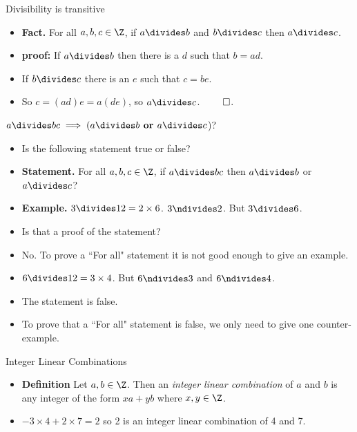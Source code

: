 \documentclass[handout]{beamer}
\begin{document}

\begin{frame}{Divisibility is transitive}

\begin{itemize}
  \item \textbf{Fact.} For all $a,b,c\in\Z$, if
  $a\divides b$ and $b\divides c$ then $a\divides c$.
  \item \textbf{proof:} If $a\divides b$ then there is a $d$ such that $b=ad$.
  \item If $b\divides c$ there is an $e$ such that $c = b e$.
  \item So $c = (a d) e = a (de)$, so $a\divides c$. $\qed$.
\end{itemize}

\end{frame}


\begin{frame}{$a\divides bc \implies (a\divides b \textbf{ or } a\divides c$)?}
\begin{itemize}
  \item Is the following statement true or false?
  \item \textbf{Statement.} For all $a,b,c\in\Z$, if $a\divides bc$ then
  $a\divides b$ or $a\divides c$?
  \item \textbf{Example.} $3 \divides 12 = 2 \times 6$. $3\ndivides 2$. But $3\divides 6$.
  \item Is that a proof of the statement?
  \item No. To prove a ``For all" statement it is not good enough to give an example.
  \item $6\divides 12 = 3\times 4$. But $6\ndivides 3$ and $6\ndivides 4$.
  \item The statement is false.
  \item To prove that a ``For all" statement is false, we only need to give one counter-example.
\end{itemize}
\end{frame}


\begin{frame}{Integer Linear Combinations}

\begin{itemize}
  \item \textbf{Definition} Let $a,b\in\Z$. Then an
  \emph{integer linear combination} of $a$ and $b$ is any integer of the
  form $xa + yb$ where $x,y\in\Z$.
  \item $-3\times 4 + 2\times 7 = 2$ so 2 is an integer linear combination
  of 4 and 7.
\end{itemize}

\end{frame}
\end{document}
